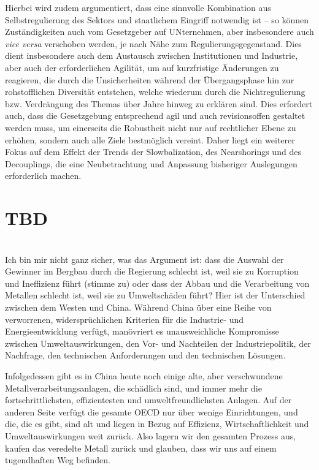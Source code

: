 \documentclass[12pt,a4paper,oneside]{book} %
\begin{document}
Hierbei wird zudem argumentiert, dass eine sinnvolle Kombination aus Selbstregulierung des Sektors und staatlichem Eingriff notwendig ist -- so können Zuständigkeiten auch vom Gesetzgeber auf UNternehmen, aber insbesondere auch \textit{vice versa} verschoben werden, je nach Nähe zum Regulierungsgegenstand. Dies dient insbesondere auch dem Austausch zwischen Institutionen und Industrie, aber auch der erforderlichen Agilität, um auf kurzfristige Änderungen zu reagieren, die durch die Unsicherheiten während der Übergangsphase hin zur rohstofflichen Diversität entstehen, welche wiederum durch die Nichtregulierung bzw. Verdrängung des Themas über Jahre hinweg zu erklären sind. Dies erfordert auch, dass die Gesetzgebung entsprechend agil und auch revisionsoffen gestaltet werden muss, um einerseits die Robustheit nicht nur auf rechtlicher Ebene zu erhöhen, sondern auch alle Ziele bestmöglich vereint. Daher liegt ein weiterer Fokus auf dem Effekt der Trends der Slowbalization, des Nearshorings und des Decouplings, die eine Neubetrachtung und Anpassung bisheriger Auslegungen erforderlich machen.

\section{TBD}
\\
Ich bin mir nicht ganz sicher, was das Argument ist: dass die Auswahl der Gewinner im Bergbau durch die Regierung schlecht ist, weil sie zu Korruption und Ineffizienz führt (stimme zu) oder dass der Abbau und die Verarbeitung von Metallen schlecht ist, weil sie zu Umweltschäden führt? Hier ist der Unterschied zwischen dem Westen und China. Während China über eine Reihe von verworrenen, widersprüchlichen Kriterien für die Industrie- und Energieentwicklung verfügt, manövriert es unausweichliche Kompromisse zwischen Umweltauswirkungen, den Vor- und Nachteilen der Industriepolitik, der Nachfrage, den technischen Anforderungen und den technischen Lösungen.

Infolgedessen gibt es in China heute noch einige alte, aber verschwundene Metallverarbeitungsanlagen, die schädlich sind, und immer mehr die fortschrittlichsten, effizientesten und umweltfreundlichsten Anlagen. Auf der anderen Seite verfügt die gesamte OECD nur über wenige Einrichtungen, und die, die es gibt, sind alt und liegen in Bezug auf Effizienz, Wirtschaftlichkeit und Umweltauswirkungen weit zurück. Also lagern wir den gesamten Prozess aus, kaufen das veredelte Metall zurück und glauben, dass wir uns auf einem tugendhaften Weg befinden.
\end{document}
